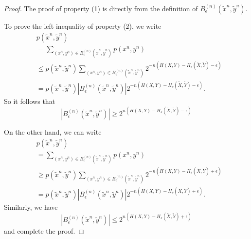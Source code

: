 \documentclass[12pt, draftclsnofoot,onecolumn]{IEEEtran}
\begin{document}
\begin{proof}
The proof of property (1) is directly from the definition of $B_{\epsilon}^{(n)}\left(\tilde{x}^n,\tilde{y}^n\right)$.

To prove the left inequality of property (2), we write
\begin{equation}
\begin{aligned}
&p\left(\tilde{x}^n,\tilde{y}^n\right)\\
&=\sum_{(x^n,y^n)\in B_{\epsilon}^{(n)}\left(\tilde{x}^n,\tilde{y}^n\right)} p\left(x^n,y^n\right)\\
&\leq p\left(\tilde{x}^n,\tilde{y}^n\right) \sum_{(x^n,y^n) \in B_{\epsilon}^{(n)}\left(\tilde{x}^n,\tilde{y}^n\right)}2^{-n\left(H(X,Y)-H_s(\tilde{X},\tilde{Y})-\epsilon\right)}\\
& =p\left(\tilde{x}^n,\tilde{y}^n\right) \left|B_{\epsilon}^{(n)}\left(\tilde{x}^n,\tilde{y}^n\right)\right| 2^{-n\left(H(X,Y)-H_s(\tilde{X},\tilde{Y})-\epsilon\right)}.
\end{aligned}
\end{equation}
So it follows that
\begin{equation}
\left|B_{\epsilon}^{(n)}\left(\tilde{x}^n,\tilde{y}^n\right)\right|\geq 2^{n\left(H(X,Y)-H_s(\tilde{X},\tilde{Y})-\epsilon\right)}
\end{equation}

On the other hand, we can write
\begin{equation}
\begin{aligned}
&p\left(\tilde{x}^n,\tilde{y}^n\right)\\
&=\sum_{(x^n,y^n)\in B_{\epsilon}^{(n)}\left(\tilde{x}^n,\tilde{y}^n\right)} p\left(x^n,y^n\right) \\
&\geq p\left(\tilde{x}^n,\tilde{y}^n\right) \sum_{(x^n,y^n) \in B_{\epsilon}^{(n)}\left(\tilde{x}^n,\tilde{y}^n \right)}2^{-n\left(H(X,Y)-H_s(\tilde{X},\tilde{Y})+\epsilon\right)}\\
& =p\left(\tilde{x}^n,\tilde{y}^n\right) \left|B_{\epsilon}^{(n)}\left(\tilde{x}^n,\tilde{y}^n\right)\right| 2^{-n\left(H(X,Y)-H_s(\tilde{X},\tilde{Y})+\epsilon\right)}.
\end{aligned}
\end{equation}
Similarly, we have
\begin{equation}
\left|B_{\epsilon}^{(n)}\left(\tilde{x}^n,\tilde{y}^n\right)\right| \leq 2^{n\left(H(X,Y)-H_s(\tilde{X},\tilde{Y})+\epsilon\right)}
\end{equation}
and complete the proof.
\end{proof}
\end{document}
